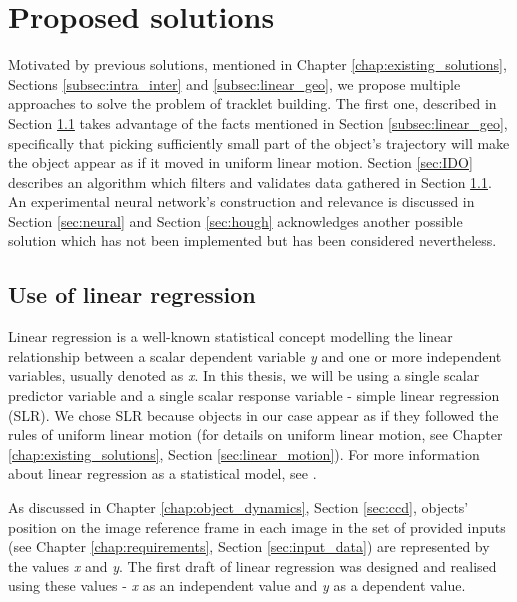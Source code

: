 \chapter{Proposed solutions}\label{chap:proposed_solutions}

	Motivated by previous solutions, mentioned in Chapter \ref{chap:existing_solutions}, Sections \ref{subsec:intra_inter} and \ref{subsec:linear_geo}, we propose multiple approaches to solve the problem of tracklet building. The first one, described in Section \ref{sec:linear_regression} takes advantage of the facts mentioned in Section \ref{subsec:linear_geo}, specifically that picking sufficiently small part of the object's trajectory will make the object appear as if it moved in uniform linear motion. Section \ref{sec:IDO} describes an algorithm which filters and validates data gathered in Section \ref{sec:linear_regression}. An experimental neural network's construction and relevance is discussed in Section \ref{sec:neural} and Section \ref{sec:hough} acknowledges another possible solution which has not been implemented but has been considered nevertheless.

\section{Use of linear regression}\label{sec:linear_regression}

	Linear regression is a well-known statistical concept modelling the linear relationship between a scalar dependent variable \emph{y} and one or more independent variables, usually denoted as \emph{x}. In this thesis, we will be using a single scalar predictor variable and a single scalar response variable - simple linear regression (SLR). We chose SLR because objects in our case appear as if they followed the rules of uniform linear motion (for details on uniform linear motion, see Chapter \ref{chap:existing_solutions}, Section \ref{sec:linear_motion}). For more information about linear regression as a statistical model, see \citep{freedman2005statistical}.
	
	As discussed in Chapter \ref{chap:object_dynamics}, Section \ref{sec:ccd}, objects' position on the image reference frame in each image in the set of provided inputs (see Chapter \ref{chap:requirements}, Section \ref{sec:input_data}) are represented by the values \emph{x} and \emph{y}. The first draft of linear regression was designed and realised using these values - \emph{x} as an independent value and \emph{y} as a dependent value.
	
